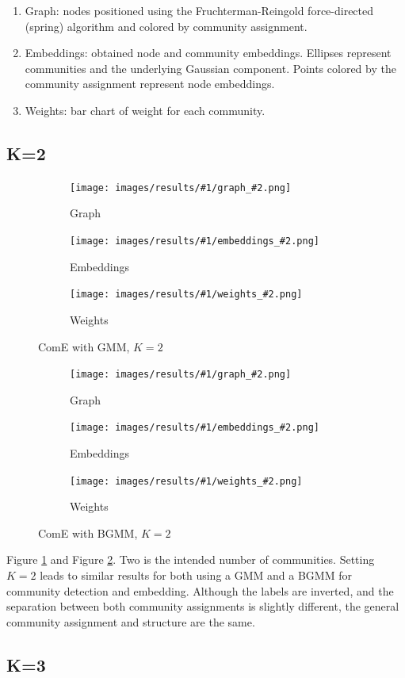 \documentclass[conference]{IEEEtran}
\begin{document}
\begin{enumerate}
    \item Graph: nodes positioned using the Fruchterman-Reingold force-directed (spring) algorithm and colored by community assignment.
    \item Embeddings: obtained node and community embeddings. Ellipses represent communities and the underlying Gaussian component. Points colored by the community assignment represent node embeddings.
    \item Weights: bar chart of weight for each community.
\end{enumerate}

\newcommand{\visresults}[2]{
    \begin{figure}[H]
        \centering
        \begin{subfigure}{.15\textwidth}
            \centering
            \texttt{[image: images/results/\#1/graph\_\#2.png]}
            \caption{Graph}
        \end{subfigure}%
        \begin{subfigure}{.15\textwidth}
            \centering
            \texttt{[image: images/results/\#1/embeddings\_\#2.png]}
            \caption{Embeddings}
        \end{subfigure}%
        \begin{subfigure}{.15\textwidth}
            \centering
            \texttt{[image: images/results/\#1/weights\_\#2.png]}
            \caption{Weights}
        \end{subfigure}%
        \caption{ComE with #1, $K=#2$}
        \label{fig:results#1#2}
    \end{figure}
}

\subsection{K=2}

\visresults{GMM}{2}
\visresults{BGMM}{2}

Figure \ref{fig:resultsGMM2} and Figure \ref{fig:resultsBGMM2}.
Two is the intended number of communities. Setting $K=2$ leads to similar results for both using a GMM and a BGMM for community detection and embedding. Although the labels are inverted, and the separation between both community assignments is slightly different, the general community assignment and structure are the same.

\subsection{K=3}
\end{document}
